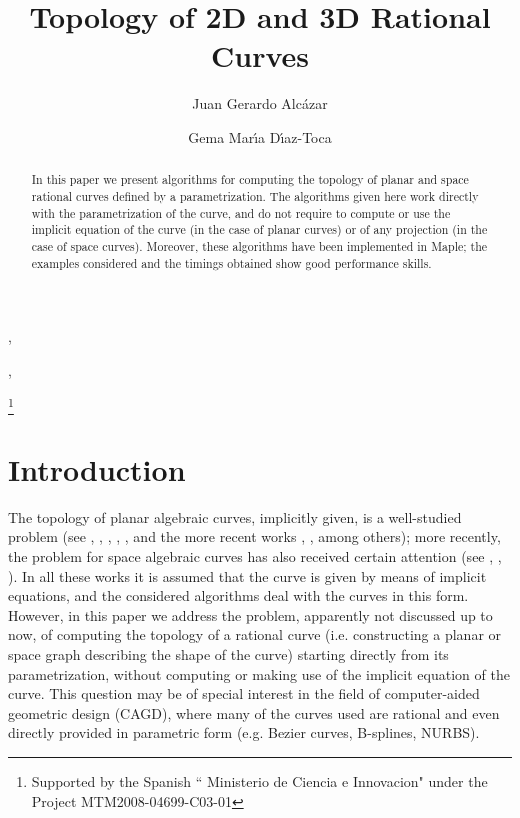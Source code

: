 \documentclass{elsart}
\begin{document}
\begin{frontmatter}






\title{Topology of 2D and 3D Rational Curves}



\author[a]{Juan Gerardo Alc\'azar},
\author[b]{Gema Mar\'{\i}a D\'{\i}az-Toca},




\address[a]{Departamento de Matem\'aticas, Universidad de Alcal\'a,
E-28871 Madrid, Spain}
\address[b]{Departamento de Matem\'atica Aplicada, Universidad de
Murcia,  30100 Murcia, Spain}




\thanks[proy]{Supported by the Spanish `` Ministerio de
Ciencia e Innovacion" under the Project MTM2008-04699-C03-01 }



\begin{abstract}
In this paper we present algorithms for computing the topology of planar and space rational
curves defined by a parametrization. The algorithms given here work directly with the
parametrization of the curve, and do not require to compute or use the implicit equation of the curve (in the case of planar curves) or
of any projection (in the case of space curves). Moreover, these algorithms
have been implemented in Maple; the examples considered and the timings obtained show good performance
skills.
\end{abstract}
\end{frontmatter}

\section{Introduction}\label{section-introduction}

The topology of planar algebraic curves, implicitly given, is a
well-studied problem (see \cite{Arnon}, \cite{gianni},
\cite{LaloCompl}, \cite{Lalo}, \cite{Hong}, and the more recent
works \cite{Eigen}, \cite{seidel}, among others); more recently,
the problem for space algebraic curves has also received certain
attention (see \cite{JG-Sendra}, \cite{Diat}, \cite{ElKa}). In all
these works it is assumed that the curve is given by means of
implicit equations, and the  considered algorithms deal with the
curves in this form. However, in this paper we address the
problem, apparently not discussed up to now, of computing the
topology of a rational curve (i.e. constructing a planar or space
graph describing the shape of the curve) starting directly from
its parametrization, without computing or making use of the
implicit equation of the curve.  This question may be of special
interest in the field of computer-aided geometric design (CAGD), where many of the curves used
are rational and even directly provided in parametric
form (e.g. Bezier curves, B-splines, NURBS).
\end{document}
